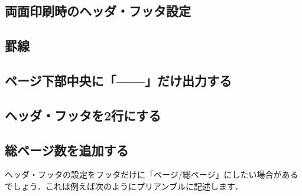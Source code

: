 \subsection{両面印刷時のヘッダ・フッタ設定}
\begin{usage}
\fancyhead{} %
\end{usage}

\subsection{罫線}
\begin{usage}
\renewcommand*{\headrulewidth}{$\<ヘッダ下部の罫線の太さ>$}
\renewcommand*{\footrulewidth}{$\<フッタ上部の罫線の太さ>$}
\end{usage}

\subsection{ページ下部中央に「---\protect{}---」だけ出力する}

\begin{usage}
\fancyhf{}
\fancyfoot[c]{---\bfseries\thepage---}
\renewcommand{\headrulewidth}{0pt}
\renewcommand{\footrulewidth}{0pt}
\end{usage}

\subsection{ヘッダ・フッタを2行にする}

\begin{intext}
\addtolength{\headheight}{\baseilneskip}
\renewcommand{\sectionmark}{\markboth{#1}{}}
\renewcommand{\subsectionmark}{\markright{#1}}
\rhead{\leftmark\\ \rightmark}
\end{intext}


\subsection{総ページ数を追加する}

ヘッダ・フッタの設定をフッタだけに「ページ/総ページ」にしたい場合がある
でしょう．これは例えば次のようにプリアンブルに記述します．

\begin{usage}
\usepackage{lastpage}
\cfoot{\thepage/\pageref{LastPage}}
\end{usage}



